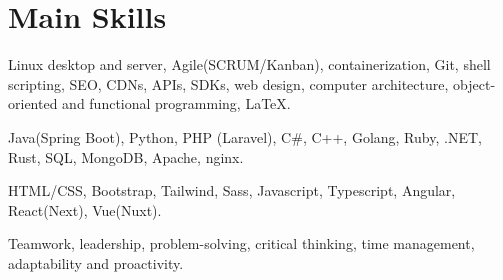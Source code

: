 \section{Main Skills}
{Linux desktop and server, Agile(SCRUM/Kanban), containerization, Git, shell scripting, SEO, CDNs, APIs, SDKs, web design, computer architecture, object-oriented and functional programming, {\LaTeX}.}

{Java(Spring Boot), Python, PHP (Laravel), C\#, C++, Golang, Ruby, .NET, Rust, SQL, MongoDB, Apache, nginx.}

{HTML/CSS, Bootstrap, Tailwind, Sass, Javascript, Typescript, Angular, React(Next), Vue(Nuxt).}

{Teamwork, leadership, problem-solving, critical thinking, time management, adaptability and proactivity.}
